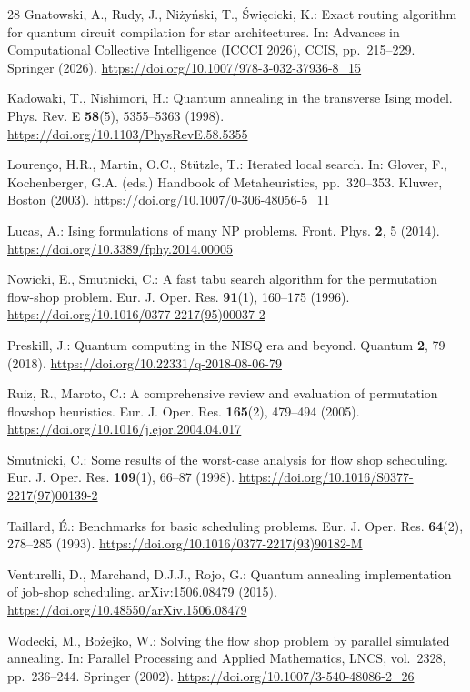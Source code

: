 \documentclass[runningheads]{llncs}
\begin{document}
\begin{thebibliography}{28}
Gnatowski, A., Rudy, J., Ni\.{z}y\'{n}ski, T., \'{S}wi\k{e}cicki, K.: Exact
routing algorithm for quantum circuit compilation for star architectures. In:
Advances in Computational Collective Intelligence (ICCCI 2026), CCIS,
pp.\ 215--229. Springer (2026).
\url{https://doi.org/10.1007/978-3-032-37936-8_15}

Kadowaki, T., Nishimori, H.: Quantum annealing in the transverse Ising
model. Phys. Rev. E \textbf{58}(5), 5355--5363 (1998).
\url{https://doi.org/10.1103/PhysRevE.58.5355}

Louren\c{c}o, H.R., Martin, O.C., St\"{u}tzle, T.: Iterated local search.
In: Glover, F., Kochenberger, G.A. (eds.) Handbook of Metaheuristics,
pp.\ 320--353. Kluwer, Boston (2003).
\url{https://doi.org/10.1007/0-306-48056-5_11}

Lucas, A.: Ising formulations of many NP problems. Front. Phys.
\textbf{2}, 5 (2014). \url{https://doi.org/10.3389/fphy.2014.00005}

Nowicki, E., Smutnicki, C.: A fast tabu search algorithm for the permutation
flow-shop problem. Eur. J. Oper. Res. \textbf{91}(1), 160--175 (1996).
\url{https://doi.org/10.1016/0377-2217(95)00037-2}

Preskill, J.: Quantum computing in the NISQ era and beyond. Quantum
\textbf{2}, 79 (2018). \url{https://doi.org/10.22331/q-2018-08-06-79}

Ruiz, R., Maroto, C.: A comprehensive review and evaluation of
permutation flowshop heuristics. Eur. J. Oper. Res. \textbf{165}(2),
479--494 (2005). \url{https://doi.org/10.1016/j.ejor.2004.04.017}

Smutnicki, C.: Some results of the worst-case analysis for flow shop
scheduling. Eur. J. Oper. Res. \textbf{109}(1), 66--87 (1998).
\url{https://doi.org/10.1016/S0377-2217(97)00139-2}

Taillard, \'{E}.: Benchmarks for basic scheduling problems. Eur. J. Oper.
Res. \textbf{64}(2), 278--285 (1993).
\url{https://doi.org/10.1016/0377-2217(93)90182-M}

Venturelli, D., Marchand, D.J.J., Rojo, G.: Quantum annealing
implementation of job-shop scheduling. arXiv:1506.08479 (2015).
\url{https://doi.org/10.48550/arXiv.1506.08479}

Wodecki, M., Bo\.{z}ejko, W.: Solving the flow shop problem by parallel
simulated annealing. In: Parallel Processing and Applied Mathematics, LNCS,
vol.\ 2328, pp.\ 236--244. Springer (2002).
\url{https://doi.org/10.1007/3-540-48086-2_26}


\end{thebibliography}
\end{document}
